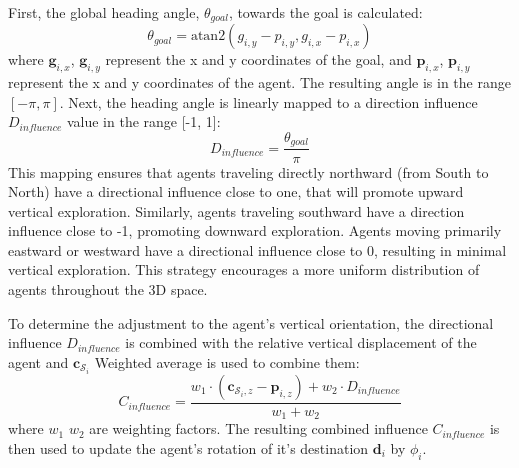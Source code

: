         First, the global heading angle, $\theta_{goal}$, towards the goal is calculated: 
        \begin{equation}
            \theta_{goal} = \text{atan2}(g_{i,y} - p_{i,y}, g_{i,x} - p_{i,x})
        \end{equation}
        where $\mathbf{g}_{i, x}$, $\mathbf{g}_{i, y}$ represent the x and y coordinates of the goal, and $\mathbf{p}_{i, x}$, $\mathbf{p}_{i, y}$ represent the x and y coordinates of the agent.
        The resulting angle is in the range $[-\pi, \pi]$.
        Next, the heading angle is linearly mapped to a direction influence $D_{influence}$ value in the range [-1, 1]:
        \begin{equation}
            D_{influence} = \frac{\theta_{goal}}{\pi}
        \end{equation}
        This mapping ensures that agents traveling directly northward (from South to North) have a directional influence close to one, that will promote upward vertical exploration. 
        Similarly, agents traveling southward have a direction influence close to -1, promoting downward exploration. 
        Agents moving primarily eastward or westward have a directional influence close to 0, resulting in minimal vertical exploration.
        This strategy encourages a more uniform distribution of agents throughout the 3D space. 

        To determine the adjustment to the agent's vertical orientation, the directional influence $D_{influence}$ is combined with the relative vertical displacement of the agent and $\mathbf{c}_{\mathcal{S}_i}$
        Weighted average is used to combine them: 
        \begin{equation}
            \label{eqn:combined_influace}
            C_{influence} = \frac{w_1 \cdot (\mathbf{c}_{\mathcal{S}_i,z} - \mathbf{p}_{i,z}) + w_2 \cdot D_{influence}}{w_1 + w_2}
        \end{equation} 
        where $w_1$ $w_2$ are weighting factors. The resulting combined influence $C_{influence}$ is then used to update the agent's rotation of it's destination $\mathbf{d}_i$ by $\phi_i$.

